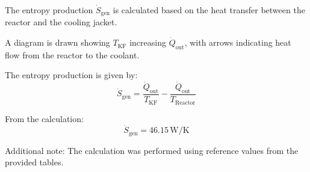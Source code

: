 The entropy production \( \dot{S}_{\text{gen}} \) is calculated based on the heat transfer between the reactor and the cooling jacket.  

A diagram is drawn showing \( T_{\text{KF}} \) increasing \( \dot{Q}_{\text{out}} \), with arrows indicating heat flow from the reactor to the coolant.  

The entropy production is given by:  
\[
\dot{S}_{\text{gen}} = \frac{\dot{Q}_{\text{out}}}{T_{\text{KF}}} - \frac{\dot{Q}_{\text{out}}}{T_{\text{Reactor}}}
\]  

From the calculation:  
\[
\dot{S}_{\text{gen}} = 46.15 \, \text{W/K}
\]  

Additional note: The calculation was performed using reference values from the provided tables.